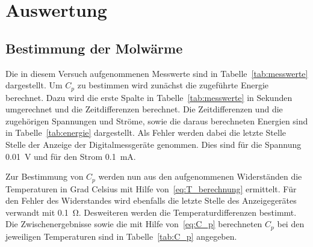 

\section{Auswertung}



\subsection{Bestimmung der Molwärme}
\label{sub:bestimmung_der_molwärme}

Die in diesem Versuch aufgenommenen Messwerte sind in
Tabelle~\ref{tab:messwerte} dargestellt. Um $C_p$ zu bestimmen wird zunächst
die zugeführte Energie berechnet. Dazu wird die erste Spalte in
Tabelle~\ref{tab:messwerte} in Sekunden umgerechnet und die Zeitdifferenzen
berechnet.  Die Zeitdifferenzen und die zugehörigen Spannungen und Ströme,
sowie die daraus berechneten Energien sind in Tabelle~\ref{tab:energie}
dargestellt. Als Fehler werden dabei die letzte Stelle Stelle der Anzeige der
Digitalmessgeräte genommen. Dies sind für die Spannung \SI{0.01}{\volt} und für
den Strom \SI{0.1}{\mA}.

Zur Bestimmung von $C_p$ werden nun aus den aufgenommenen Widerständen
die Temperaturen in Grad Celsius mit Hilfe
von~\eqref{eq:T_berechnung} ermittelt. Für den Fehler des Widerstandes wird
ebenfalls die letzte Stelle des Anzeigegerätes verwandt mit \SI{0.1}{\ohm}.
Desweiteren werden die Temperaturdifferenzen bestimmt.
Die Zwischenergebnisse sowie die mit Hilfe von~\eqref{eq:C_p}
berechneten $C_p$ bei den jeweiligen
Temperaturen sind in Tabelle~\ref{tab:C_p} angegeben.

